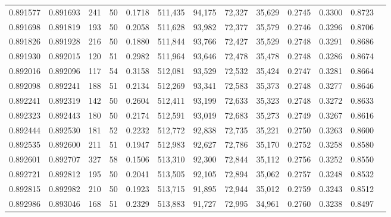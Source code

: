 \begin{tabular}{rrrrrrrrrrrrr}
0.891577 & 0.891693 &   241 &  50 &                                     0.1718 & 511,435 &  94,175 &  72,327 &  35,629 & 0.2745 & 0.3300 & 0.8723 \\
0.891698 & 0.891819 &   193 &  50 &                                     0.2058 & 511,628 &  93,982 &  72,377 &  35,579 & 0.2746 & 0.3296 & 0.8706 \\
0.891826 & 0.891928 &   216 &  50 &                                     0.1880 & 511,844 &  93,766 &  72,427 &  35,529 & 0.2748 & 0.3291 & 0.8686 \\
0.891930 & 0.892015 &   120 &  51 &                                     0.2982 & 511,964 &  93,646 &  72,478 &  35,478 & 0.2748 & 0.3286 & 0.8674 \\
0.892016 & 0.892096 &   117 &  54 &                                     0.3158 & 512,081 &  93,529 &  72,532 &  35,424 & 0.2747 & 0.3281 & 0.8664 \\
0.892098 & 0.892241 &   188 &  51 &                                     0.2134 & 512,269 &  93,341 &  72,583 &  35,373 & 0.2748 & 0.3277 & 0.8646 \\
0.892241 & 0.892319 &   142 &  50 &                                     0.2604 & 512,411 &  93,199 &  72,633 &  35,323 & 0.2748 & 0.3272 & 0.8633 \\
0.892323 & 0.892443 &   180 &  50 &                                     0.2174 & 512,591 &  93,019 &  72,683 &  35,273 & 0.2749 & 0.3267 & 0.8616 \\
0.892444 & 0.892530 &   181 &  52 &                                     0.2232 & 512,772 &  92,838 &  72,735 &  35,221 & 0.2750 & 0.3263 & 0.8600 \\
0.892535 & 0.892600 &   211 &  51 &                                     0.1947 & 512,983 &  92,627 &  72,786 &  35,170 & 0.2752 & 0.3258 & 0.8580 \\
0.892601 & 0.892707 &   327 &  58 &                                     0.1506 & 513,310 &  92,300 &  72,844 &  35,112 & 0.2756 & 0.3252 & 0.8550 \\
0.892721 & 0.892812 &   195 &  50 &                                     0.2041 & 513,505 &  92,105 &  72,894 &  35,062 & 0.2757 & 0.3248 & 0.8532 \\
0.892815 & 0.892982 &   210 &  50 &                                     0.1923 & 513,715 &  91,895 &  72,944 &  35,012 & 0.2759 & 0.3243 & 0.8512 \\
0.892986 & 0.893046 &   168 &  51 &                                     0.2329 & 513,883 &  91,727 &  72,995 &  34,961 & 0.2760 & 0.3238 & 0.8497 \\

\end{tabular}
